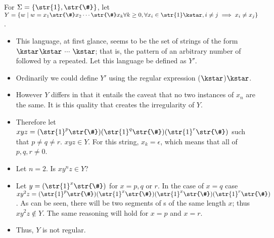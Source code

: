 For $\Sigma = \{ \str{1}, \str{\#} \}$, let $Y = \{ w \mid w = x_1\str{\#}x_2 \cdots \str{\#}x_k \forall k \geq 0, \forall x_i \in \str{1}\kstar, i \neq j \implies x_i \neq x_j \}$.

\begin{itemize}
	\item This language, at first glance, seems to be the set of strings of the form $\kstar$\str{\#}$\kstar$\str{\#} $\cdots$ $\kstar$; that is, the pattern of an arbitrary number of  followed by a \str{\#} repeated. Let this language be defined as $Y'$.
	\item Ordinarily we could define $Y'$ using the regular expression ($\kstar$\str{\#})$\kstar$.
	\item However $Y$ differs in that it entails the caveat that no two instances of $x_n$ are the same. It is this quality that creates the irregularity of $Y$.
	\item Therefore let $xyz = (\str{1}^p\str{\#})(\str{1}^q\str{\#})(\str{1}^r\str{\#})$ such that $p \neq q \neq r$. $xyz \in Y$. For this string, $x_k = \epsilon$, which means that all of $p, q, r \neq 0$.
	\item Let $n = 2$. Is $xy^nz \in Y$?
	\item Let $y = (\str{1}^x\str{\#})$ for $x = p, q$ or $r$. In the case of $x = q$ case $xy^2z = (\str{1}^p\str{\#})(\str{1}^x\str{\#})(\str{1}^x\str{\#})(\str{1}^r\str{\#})$. As can be seen, there will be two segments of s of the same length $x$; thus $xy^2z \notin Y$. The same reasoning will hold for $x = p$ and $x = r$.
	\item Thus, $Y$ is not regular.
\end{itemize}